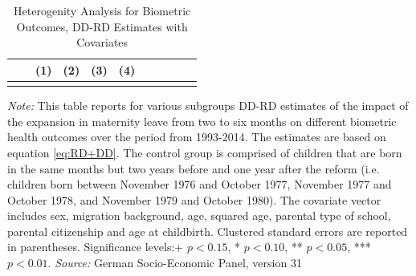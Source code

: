 \documentclass[a4paper ]{article}
\newlength\FHoffset
\begin{document}
\newpage



\begin{table}[p] \centering
\def\sym#1{\ifmmode^{#1}\else\(^{#1}\)\fi}
\caption{Heterogenity Analysis for Biometric Outcomes, DD-RD Estimates with Covariates}\label{tab:Heterog_BMCV}
\begin{tabular}{l*{10}{c}}
\toprule
&  &\multicolumn{1}{c}{(1)}&\multicolumn{1}{c}{(2)}&\multicolumn{1}{c}{(3)}&\multicolumn{1}{c}{(4)} \\ 
\midrule\\
	 
 \bottomrule
\end{tabular}
\begin{minipage}{\textwidth} %
{\footnotesize \textit{Note:} This table reports for various subgroups DD-RD estimates of the impact of the expansion in maternity leave from two to six months on different biometric health outcomes over the period from 1993-2014. The estimates are based on equation \ref{eq:RD+DD}. The control group is comprised of children that are born in the same months but two years before and one year after the reform (i.e. children born between November 1976 and October 1977, November 1977 and October 1978, and November 1979 and October 1980). The covariate vector includes sex, migration background, age, squared age, parental type of school, parental citizenship and age at childbirth.\newline
Clustered standard errors are reported in parentheses. Significance levels:+ \(p<0.15\), * \(p<0.10\), ** \(p<0.05\), *** \(p<0.01\). \newline \textit{Source: }German Socio-Economic Panel, version 31\par}
\end{minipage}
\end{table}


	

	
		\setlength\FHoffset{-2.5cm} 
\fancyheadoffset{\FHoffset}
\end{document}
